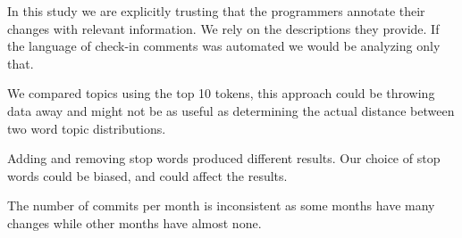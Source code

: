 \documentclass[times, 10pt,twocolumn]{article}
\newcommand{\shrinkit}{\vspace*{-.3em}}
\begin{document}


\shrinkit
{}
\shrinkit

In this study we are explicitly trusting that the programmers annotate
their changes with relevant information. We rely on the descriptions
they provide. If the language of check-in comments was automated we
would  be analyzing only that.

We compared topics using the top 10 tokens, this approach could be
throwing data away and might not be as useful as determining the
actual distance between two word topic distributions.


Adding and removing stop words produced different results. Our choice
of stop words could be biased, and could affect the results.


The number of commits per month is inconsistent as some months have
many changes while other months have almost none.



\end{document}
